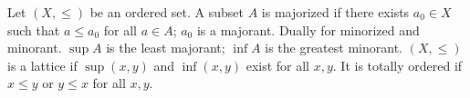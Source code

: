 Let $(X, \leq)$ be an ordered set. A subset $A$ is majorized if there exists $a_0 \in X$ such that $a \leq a_0$ for all $a \in A$; $a_0$ is a majorant. Dually for minorized and minorant. $\sup A$ is the least majorant; $\inf A$ is the greatest minorant. $(X, \leq)$ is a lattice if $\sup(x, y)$ and $\inf(x, y)$ exist for all $x, y$. It is totally ordered if $x \leq y$ or $y \leq x$ for all $x, y$.
